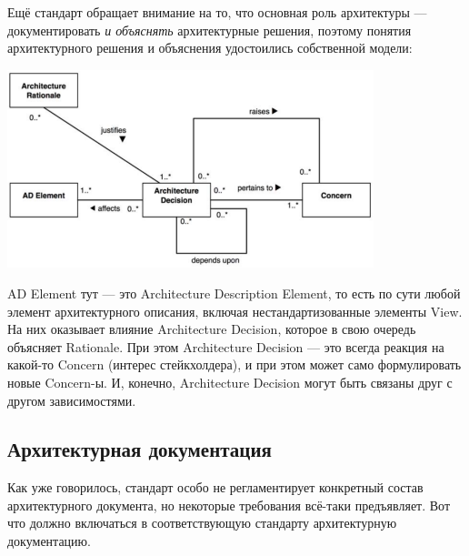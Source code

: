 \documentclass[a5paper]{article}
\begin{document}
Ещё стандарт обращает внимание на то, что основная роль архитектуры --- документировать \emph{и объяснять} архитектурные решения, поэтому понятия архитектурного решения и объяснения удостоились собственной модели:

\begin{center}
    \includegraphics[width=0.8\textwidth]{ieee42010Decision.png}
\end{center}

AD Element тут --- это Architecture Description Element, то есть по сути любой элемент архитектурного описания, включая нестандартизованные элементы View. На них оказывает влияние Architecture Decision, которое в свою очередь объясняет Rationale. При этом Architecture Decision --- это всегда реакция на какой-то Concern (интерес стейкхолдера), и при этом может само формулировать новые Concern-ы. И, конечно, Architecture Decision могут быть связаны друг с другом зависимостями.

\subsection{Архитектурная документация}

Как уже говорилось, стандарт особо не регламентирует конкретный состав архитектурного документа, но некоторые требования всё-таки предъявляет. Вот что должно включаться в соответствующую стандарту архитектурную документацию.
\end{document}
